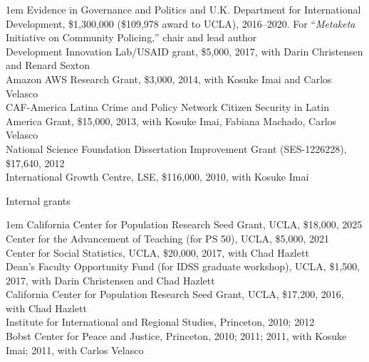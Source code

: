 \documentclass[10.9pt]{article}
\makeatletter
\newcommand\donotbreakhere{\par\nobreak\@afterheading\vspace{1em}}
\newenvironment{indnt}{\begin{adjustwidth}{1em}{}}{\end{adjustwidth}}
\makeatother
\begin{document}
\begin{indnt}
Evidence in Governance and Politics and U.K. Department for International Development, \$1,300,000 (\$109,978 award to UCLA), 2016--2020. For ``{\it Metaketa} Initiative on Community Policing,'' chair and lead author  \\[.75em]
Development Innovation Lab/USAID grant, \$5,000, 2017, with Darin Christensen and Renard Sexton \\[.75em]
Amazon AWS Research Grant, \$3,000, 2014, with Kosuke Imai and Carlos Velasco\\[.75em]
CAF-America Latina Crime and Policy Network Citizen Security in Latin America Grant, \$15,000, 2013, with Kosuke Imai, Fabiana Machado, Carlos Velasco\\[.75em]
National Science Foundation Dissertation Improvement Grant (SES-1226228), \$17,640, 2012\\[.75em]
International Growth Centre, LSE, \$116,000, 2010, with Kosuke Imai
\end{indnt}
\vspace{1.5em}

{\large Internal grants}\donotbreakhere
\begin{indnt}
 California Center for Population Research Seed Grant, UCLA, \$18,000, 2025\\[.75em]
 Center for the Advancement of Teaching (for PS 50), UCLA, \$5,000, 2021\\[.75em]
 Center for Social Statistics, UCLA, \$20,000, 2017, with Chad Hazlett \\[.75em]
 Dean's Faculty Opportunity Fund (for IDSS graduate workshop), UCLA, \$1,500, 2017, with Darin Christensen and Chad Hazlett \\[.75em]
 California Center for Population Research Seed Grant, UCLA, \$17,200, 2016, with Chad Hazlett\\[.75em]
 Institute for International and Regional Studies, Princeton, 2010; 2012 \\[.75em]
 Bobst Center for Peace and Justice, Princeton, 2010; 2011; 2011, with Kosuke Imai; 2011, with Carlos Velasco 
\end{indnt}
\vspace{1.5em}
\end{document}
